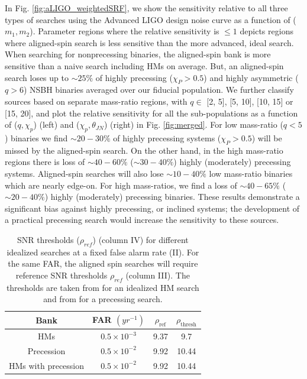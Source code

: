 In Fig. \ref{fig:aLIGO_weightedSRF}, we show the sensitivity relative to all three types of searches using the Advanced LIGO design noise curve as a function of ($m_1, m_2$). Parameter regions where the relative sensitivity is $\leq 1$ depicts regions where aligned-spin search is less sensitive than the more advanced, ideal search. When searching for nonprecessing binaries, the aligned-spin bank is more sensitive than a naive search including HMs on average. But, an aligned-spin search loses up to $\sim 25\%$ of highly precessing ($\chi_P > 0.5$) and highly asymmetric ($q > 6$) NSBH binaries averaged over our fiducial population. We further classify sources based on separate mass-ratio regions, with $q\in$ [2, 5], [5, 10], [10, 15] or [15, 20], and plot the relative sensitivity for all the sub-populations as a function of ($q, \chi_p$) (left) and ($\chi_p, \theta_{JN}$) (right) in Fig. \ref{fig:merged}. For low mass-ratio ($q < 5$) binaries we find $\sim 20-30\%$ of highly precessing systems ($\chi_P > 0.5$) will be missed by the aligned-spin search. On the other hand, in the high mass-ratio regions there is loss of $\sim 40-60\%$ ($\sim 30-40\%$) highly (moderately) precessing systems. Aligned-spin searches will also lose $\sim 10-40\%$ low mass-ratio binaries which are nearly edge-on. For high mass-ratios, we find a loss of $\sim 40-65\%$ ($\sim 20-40\%$)  highly (moderately) precessing binaries. These results demonstrate a significant bias against highly precessing, or inclined systems; the development of a practical precessing search would increase the sensitivity to these sources.

\begin{table}
    \centering
    \begin{tabular}{c|c|c|c}
         Bank &  FAR $(yr^{-1})$ & $\rho_{\text{ref}}$ & $\rho_{\text{thresh}}$ \\
        \hline
        \hline
        HMs & $0.5 \times 10^{-3}$ & 9.37 &  9.7 \\
        \hline 
        Precession & $0.5 \times 10^{-2}$ & 9.92 & 10.44 \\
        \hline
        HMs with precession & $0.5 \times 10^{-2}$ & 9.92 & 10.44
    \end{tabular}
    \caption{ SNR thresholds ($\rho_{ref}$) (column IV) for different idealized searches at a fixed false alarm rate (II). For the same FAR, the aligned spin searches will require reference SNR thresholds $\rho_{ref}$ (column III). The thresholds are taken from \cite{Harry:2017weg} for an idealized HM search and from \cite{Harry:2016ijz} for a precessing search.}
    \label{tab:FAR}
\end{table}


